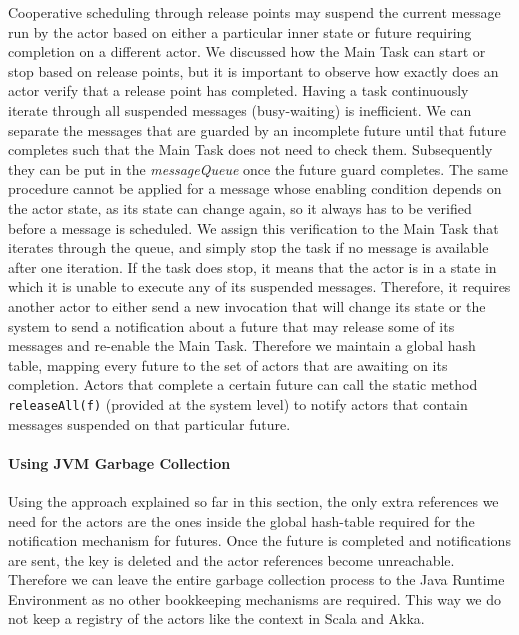 Cooperative scheduling through release points may suspend the current message run by the actor based on either a particular inner state or future requiring completion on a different actor. We discussed how the Main Task can start or stop based on release points, but it is important to observe how exactly does an actor verify that a release point has completed. Having a task continuously iterate through all suspended messages (busy-waiting) is inefficient. We can separate the messages that are guarded by an incomplete future until that future completes such that the Main Task does not need to check them. Subsequently they can be put in the \textit{messageQueue} once the future guard completes. 
The same procedure cannot be applied for a message whose enabling condition depends on the actor state, as its state can change again, so it always has to be verified before a message is scheduled. We assign this verification to the Main Task that iterates through the queue, and simply stop the task if no message is available after one iteration. If the task does stop, it means that the actor is in a state in which it is unable to execute any of its suspended messages. Therefore, it requires another actor to either send a new invocation that will change its state or the system to send a notification about a future that may release some of its messages and re-enable the Main Task. 
Therefore we maintain a global hash table, mapping every future to the set of actors that are awaiting on its completion. 
Actors that complete a certain future can call the static method \lstinline|releaseAll(f)| (provided at the system level) to notify actors that contain messages suspended on that particular future. 
 
\paragraph{Using JVM Garbage Collection}
Using the approach explained so far in this section, the only extra references we need for the actors are the ones inside the global hash-table required for the notification mechanism for futures. Once the future is completed and notifications are sent, the key is deleted and the actor references become unreachable. Therefore we can leave the entire garbage collection process to the Java Runtime Environment as no other bookkeeping mechanisms are required. This way we do not keep a registry of the actors like the {\ttfamily context} in Scala and Akka.









